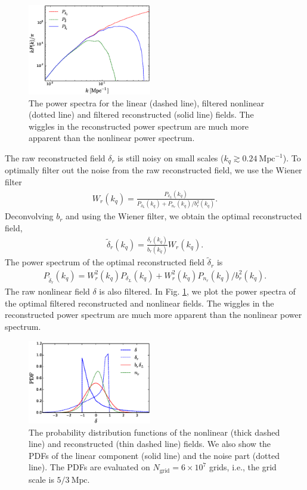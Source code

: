 \documentclass[aps,prd,twocolumn,showpacs,superscriptaddress,groupedaddress,nofootinbib]{revtex4}  %
\newcommand{\mr}{\mathrm}
\newcommand{\bea}{\begin{eqnarray}}
\newcommand{\eea}{\end{eqnarray}}
\begin{document}
\begin{figure}[tbp]
\begin{center}
\includegraphics[width=0.48\textwidth]{f5.eps}
\end{center}
\vspace{-0.7cm}
\caption{The power spectra for the linear (dashed line), filtered nonlinear
(dotted line) and filtered reconstructed (solid line) fields.
The wiggles in the reconstructed power 
spectrum are much more apparent than the nonlinear power spectrum.}
\label{fig:wf}
\end{figure}


The raw reconstructed field $\delta_r$ is still noisy on small scales 
($k_q\gtrsim0.24\ \mr{Mpc}^{-1}$). To optimally filter out the noise from the 
raw reconstructed field, we use the Wiener filter
\bea
W_r(k_q)=\frac{P_{\delta_L}(k_q)}{P_{\delta_L}(k_q)+P_{n_r}(k_q)/b_r^2(k_q)}.
\eea
Deconvolving $b_r$ and using the Wiener filter, we obtain the optimal 
reconstructed field,
\bea
\tilde{\delta}_r(k_q)=\frac{\delta_r(k_q)}{b_r(k_q)}W_r(k_q).
\eea
The power spectrum of the optimal reconstructed field $\tilde{\delta}_r$ is 
\bea
P_{\tilde{\delta}_r}(k_q)=W_r^2(k_q)P_{\delta_L}(k_q)+W_r^2(k_q)
{P_{n_r}(k_q)}/{b_r^2(k_q)}.
\eea
The raw nonlinear field $\delta$ is also filtered. 
In Fig. \ref{fig:wf}, we plot the power spectra of the optimal filtered 
reconstructed and nonlinear fields. The wiggles in the reconstructed power 
spectrum are much more apparent than the nonlinear power spectrum.

\begin{figure}[tbp]
\begin{center}
\includegraphics[width=0.48\textwidth]{f6.eps}
\end{center}
\vspace{-0.7cm}
\caption{The probability distribution functions of the nonlinear (thick dashed 
line) and reconstructed (thin dashed line) fields. 
We also show the PDFs of the linear component 
(solid line) and the noise part (dotted line). The PDFs are evaluated on 
$N_\mr{grid}=6\times10^7$ grids, i.e., the grid scale is $5/3\ \mr{Mpc}$.}
\label{fig:pdf}
\end{figure}
\end{document}
